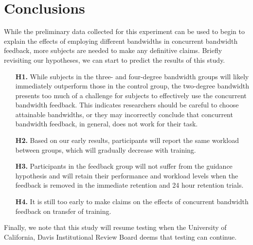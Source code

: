 \section{Conclusions}
While the preliminary data collected for this experiment can be used to begin to explain the effects of employing different bandwidths in concurrent bandwidth feedback, more subjects are needed to make any definitive claims.
Briefly revisiting our hypotheses, we can start to predict the results of this study.
\begin{itemize}
    \item[\textbf{H1.}] While subjects in the three- and four-degree bandwidth groups will likely immediately outperform those in the control group, the two-degree bandwidth presents too much of a challenge for subjects to effectively use the concurrent bandwidth feedback.
          This indicates researchers should be careful to choose attainable bandwidths, or they may incorrectly conclude that concurrent bandwidth feedback, in general, does not work for their task.
    \item[\textbf{H2.}] Based on our early results, participants will report the same workload between groups, which will gradually decrease with training.
    \item[\textbf{H3.}] Participants in the feedback group will not suffer from the guidance hypothesis and will retain their performance and workload levels when the feedback is removed in the immediate retention and 24 hour retention trials.
    \item[\textbf{H4.}] It is still too early to make claims on the effects of concurrent bandwidth feedback on transfer of training.
\end{itemize}
Finally, we note that this study will resume testing when the University of California, Davis Institutional Review Board deems that testing can continue.
